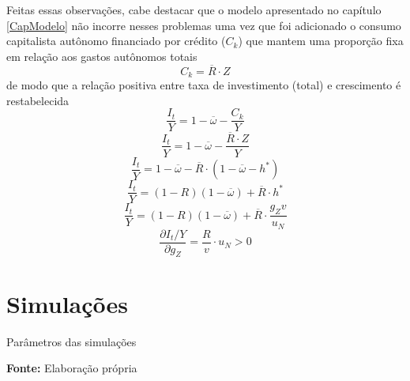 Feitas essas observações, cabe destacar que o modelo apresentado no capítulo \ref{CapModelo} não incorre nesses problemas uma vez que foi adicionado o consumo capitalista autônomo financiado por crédito ($C_k$) que mantem uma proporção fixa em relação aos gastos autônomos totais
$$
C_k = \overline R \cdot Z
$$
de modo que a relação positiva entre taxa de investimento (total) e crescimento é restabelecida
$$
\frac{I_t}{Y} = 1 - \overline \omega - \frac{C_k}{Y}
$$
$$
\frac{I_t}{Y} = 1 - \overline \omega - \frac{\overline R\cdot Z}{Y}
$$
$$
\frac{I_t}{Y} = 1 - \overline \omega - \overline R \cdot (1 - \overline \omega - h^*)
$$
$$
\frac{I_t}{Y} = (1-R)(1 - \overline \omega) + \overline R \cdot h^*
$$
$$
\frac{I_t}{Y} = (1-R)(1 - \overline \omega) + \overline R \cdot \frac{g_Z v}{u_N}
$$
$$
\frac{\partial I_t/Y}{\partial g_Z} = \frac{R}{v}\cdot u_N > 0
$$

\section{Simulações}


\begin{table}[H]
	\centering
	\caption{Parâmetros das simulações}
	\label{Resumo_Simulacao}
	
	\caption*{\textbf{Fonte:} Elaboração própria}
\end{table}